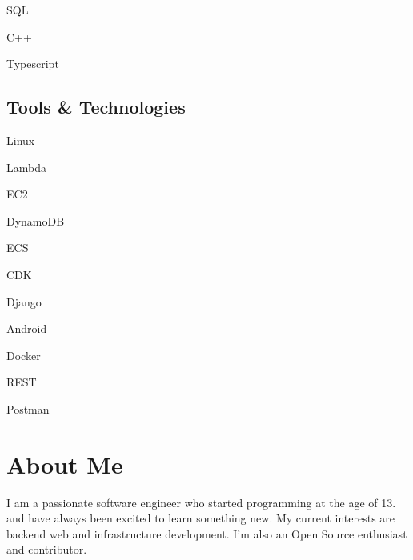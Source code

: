 \documentclass[]{resume}
\begin{document}
\begin{minipage}[t]{0.25\textwidth}
\begin{itemize*}
 \item SQL
 \item C++
 \item Typescript
\end{itemize*}
\subsectionsep

\subsection{Tools \& Technologies}
\begin{itemize*}
 \item Linux
 \item Lambda
 \item EC2
 \item DynamoDB
 \item ECS
 \item CDK
 \item Django
 \item Android
 \item Docker
 \item REST
 \item Postman
\end{itemize*}
\secondarysectionsep

\section{About Me}
\noindent \RaggedRight \normalfont
I am a passionate software engineer who started programming at the age of 13.
and have always been excited to learn something new. My current interests are
backend web and infrastructure development. I'm also an Open Source enthusiast
and contributor.

%
%

\end{minipage}
\hfill
\end{document}
